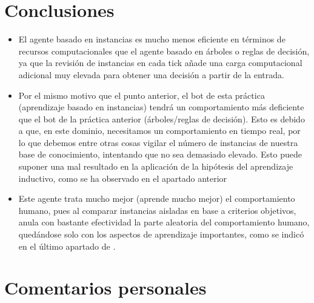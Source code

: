 \documentclass[10pt, spanish, pdftex]{../.template/template}
\newcommand*{\namerefs}[1]{\textit{\underline{\color{uc3mNewBlue}\nameref{#1}}}}
\begin{document}
\section{Conclusiones}\label{c}
\begin{itemize}
    \item El agente basado en instancias es mucho menos eficiente en términos de recursos computacionales que el agente basado en árboles o reglas de decisión, ya que la revisión de instancias en cada tick añade una carga computacional adicional muy elevada para obtener una decisión a partir de la entrada.

    \item Por el mismo motivo que el punto anterior, el bot de esta práctica (aprendizaje basado en instancias) tendrá un comportamiento más deficiente que el bot de la práctica anterior (árboles/reglas de decisión). Esto es debido a que, en este dominio, necesitamos un comportamiento en tiempo real, por lo que debemos entre otras cosas vigilar el número de instancias de nuestra base de conocimiento, intentando que no sea demasiado elevado. Esto puede suponer una mal resultado en la aplicación de la hipótesis del aprendizaje inductivo, como se ha observado en el apartado anterior \namerefs{e}

    \item Este agente trata mucho mejor (aprende mucho mejor) el comportamiento humano, pues al comparar instancias aisladas en base a criterios objetivos, anula con bastante efectividad la parte aleatoria del comportamiento humano, quedándose solo con los aspectos de aprendizaje importantes, como se indicó en el último apartado de \namerefs{tde}.
\end{itemize}

\section{Comentarios personales}\label{cp}
\end{document}
